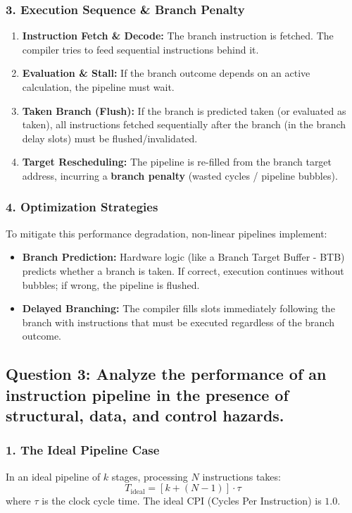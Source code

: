 \documentclass[11pt, a4paper]{article}
\begin{document}
\subsubsection*{3. Execution Sequence \& Branch Penalty}
\begin{enumerate}
    \item \textbf{Instruction Fetch \& Decode:} The branch instruction is fetched. The compiler tries to feed sequential instructions behind it.
    \item \textbf{Evaluation \& Stall:} If the branch outcome depends on an active calculation, the pipeline must wait.
    \item \textbf{Taken Branch (Flush):} If the branch is predicted taken (or evaluated as taken), all instructions fetched sequentially after the branch (in the branch delay slots) must be flushed/invalidated.
    \item \textbf{Target Rescheduling:} The pipeline is re-filled from the branch target address, incurring a \textbf{branch penalty} (wasted cycles / pipeline bubbles).
\end{enumerate}

\subsubsection*{4. Optimization Strategies}
To mitigate this performance degradation, non-linear pipelines implement:
\begin{itemize}
    \item \textbf{Branch Prediction:} Hardware logic (like a Branch Target Buffer - BTB) predicts whether a branch is taken. If correct, execution continues without bubbles; if wrong, the pipeline is flushed.
    \item \textbf{Delayed Branching:} The compiler fills slots immediately following the branch with instructions that must be executed regardless of the branch outcome.
\end{itemize}

\subsection*{Question 3: Analyze the performance of an instruction pipeline in the presence of structural, data, and control hazards.}

\subsubsection*{1. The Ideal Pipeline Case}
In an ideal pipeline of $k$ stages, processing $N$ instructions takes:
\[ T_{\text{ideal}} = [k + (N - 1)] \cdot \tau \]
where $\tau$ is the clock cycle time. The ideal CPI (Cycles Per Instruction) is $1.0$.
\end{document}
